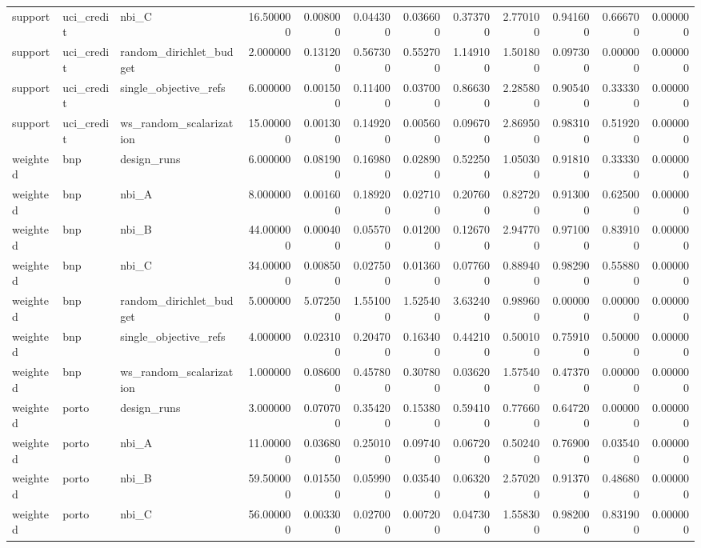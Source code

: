 \begin{landscape}
\begin{longtable}{lllrrrrrrrrr}
support & uci\_credit & nbi\_C & 16.500000 & 0.008000 & 0.044300 & 0.036600 & 0.373700 & 2.770100 & 0.941600 & 0.666700 & 0.000000 \\
support & uci\_credit & random\_dirichlet\_budget & 2.000000 & 0.131200 & 0.567300 & 0.552700 & 1.149100 & 1.501800 & 0.097300 & 0.000000 & 0.000000 \\
support & uci\_credit & single\_objective\_refs & 6.000000 & 0.001500 & 0.114000 & 0.037000 & 0.866300 & 2.285800 & 0.905400 & 0.333300 & 0.000000 \\
support & uci\_credit & ws\_random\_scalarization & 15.000000 & 0.001300 & 0.149200 & 0.005600 & 0.096700 & 2.869500 & 0.983100 & 0.519200 & 0.000000 \\
weighted & bnp & design\_runs & 6.000000 & 0.081900 & 0.169800 & 0.028900 & 0.522500 & 1.050300 & 0.918100 & 0.333300 & 0.000000 \\
weighted & bnp & nbi\_A & 8.000000 & 0.001600 & 0.189200 & 0.027100 & 0.207600 & 0.827200 & 0.913000 & 0.625000 & 0.000000 \\
weighted & bnp & nbi\_B & 44.000000 & 0.000400 & 0.055700 & 0.012000 & 0.126700 & 2.947700 & 0.971000 & 0.839100 & 0.000000 \\
weighted & bnp & nbi\_C & 34.000000 & 0.008500 & 0.027500 & 0.013600 & 0.077600 & 0.889400 & 0.982900 & 0.558800 & 0.000000 \\
weighted & bnp & random\_dirichlet\_budget & 5.000000 & 5.072500 & 1.551000 & 1.525400 & 3.632400 & 0.989600 & 0.000000 & 0.000000 & 0.000000 \\
weighted & bnp & single\_objective\_refs & 4.000000 & 0.023100 & 0.204700 & 0.163400 & 0.442100 & 0.500100 & 0.759100 & 0.500000 & 0.000000 \\
weighted & bnp & ws\_random\_scalarization & 1.000000 & 0.086000 & 0.457800 & 0.307800 & 0.036200 & 1.575400 & 0.473700 & 0.000000 & 0.000000 \\
weighted & porto & design\_runs & 3.000000 & 0.070700 & 0.354200 & 0.153800 & 0.594100 & 0.776600 & 0.647200 & 0.000000 & 0.000000 \\
weighted & porto & nbi\_A & 11.000000 & 0.036800 & 0.250100 & 0.097400 & 0.067200 & 0.502400 & 0.769000 & 0.035400 & 0.000000 \\
weighted & porto & nbi\_B & 59.500000 & 0.015500 & 0.059900 & 0.035400 & 0.063200 & 2.570200 & 0.913700 & 0.486800 & 0.000000 \\
weighted & porto & nbi\_C & 56.000000 & 0.003300 & 0.027000 & 0.007200 & 0.047300 & 1.558300 & 0.982000 & 0.831900 & 0.000000 \\

\end{longtable}
\end{landscape}
